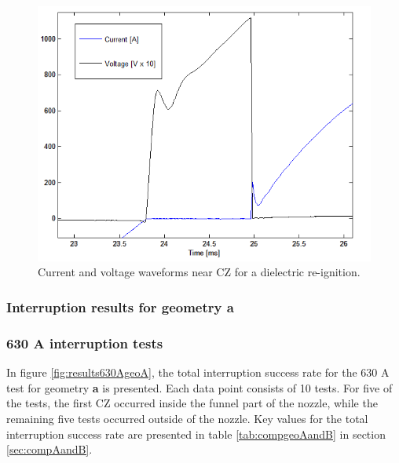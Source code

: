 \documentclass[10pt,b5paper,twoside]{article}
\begin{document}
\begin{figure}[H]
\centering
\includegraphics[scale=0.7]{Bilder/Results/DRplot2.PNG}
\caption{Current and voltage waveforms near CZ for a dielectric re-ignition.} \label{fig:CurrentAndVoltageDRWaveform}
\end{figure}

\subsubsection{Interruption results for geometry \textbf{a}}

\subsubsection*{630 A interruption tests}

In figure \ref{fig:results630AgeoA}, the total interruption success rate for the 630 A test for geometry \textbf{a} is presented. Each data point consists of 10 tests. For five of the tests, the first CZ occurred inside the funnel part of the nozzle, while the remaining five tests occurred outside of the nozzle. Key values for the total interruption success rate are presented in table \ref{tab:compgeoAandB} in section \ref{sec:compAandB}.

\end{document}

